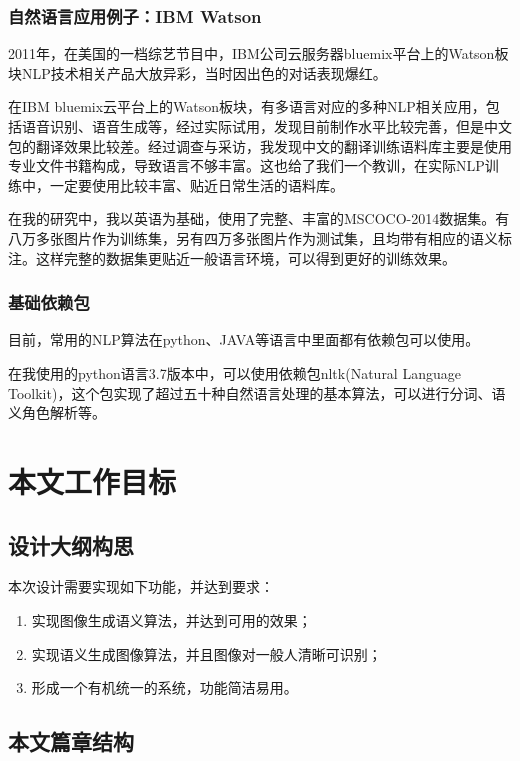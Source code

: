 \subsubsection{自然语言应用例子：IBM Watson}
2011年，在美国的一档综艺节目中，IBM公司云服务器bluemix平台上的Watson板块NLP技术相关产品大放异彩，当时因出色的对话表现爆红。

在IBM bluemix云平台上的Watson板块，有多语言对应的多种NLP相关应用，包括语音识别、语音生成等，经过实际试用，发现目前制作水平比较完善，但是中文包的翻译效果比较差。经过调查与采访，我发现中文的翻译训练语料库主要是使用专业文件书籍构成，导致语言不够丰富。这也给了我们一个教训，在实际NLP训练中，一定要使用比较丰富、贴近日常生活的语料库。

在我的研究中，我以英语为基础，使用了完整、丰富的MSCOCO-2014数据集。有八万多张图片作为训练集，另有四万多张图片作为测试集，且均带有相应的语义标注。这样完整的数据集更贴近一般语言环境，可以得到更好的训练效果。

\subsubsection{基础依赖包}
目前，常用的NLP算法在python、JAVA等语言中里面都有依赖包可以使用。

在我使用的python语言3.7版本中，可以使用依赖包nltk(Natural Language Toolkit)，这个包实现了超过五十种自然语言处理的基本算法，可以进行分词、语义角色解析等。

\section{本文工作目标}

\subsection{设计大纲构思}
本次设计需要实现如下功能，并达到要求：
\begin{enumerate}[fullwidth,itemindent=2em,label=\arabic*.]
    \item 实现图像生成语义算法，并达到可用的效果；
    \item 实现语义生成图像算法，并且图像对一般人清晰可识别；
    \item 形成一个有机统一的系统，功能简洁易用。
\end{enumerate}

\subsection{本文篇章结构}

